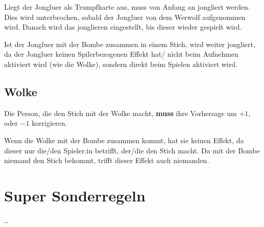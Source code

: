 \documentclass[3pt]{article}
\begin{document}
Liegt der Jongluer als Trumpfkarte aus, muss von Anfang an jongliert werden.
Dies wird unterbrochen, sobald der Jongluer von dem Werwolf aufgenommen wird.
Danach wird das jonglieren eingestellt, bis dieser wieder gespielt wird.

Ist der Jongluer mit der Bombe zusammen in einem Stich, wird weiter jongliert, da der Jongluer keinen Spilerbezogenen Effekt hat/ nicht beim Aufnehmen aktiviert wird (wie die Wolke), sondern direkt beim Spielen aktiviert wird.

\subsection{Wolke}
Die Person, die den Stich mit der Wolke macht, \textbf{muss} ihre Vorhersage um $+1$, oder $-1$ korrigieren.

Wenn die Wolke mit der Bombe zusammen kommt, hat sie keinen Effekt, da dieser nur die/den Spieler:in betrifft, der/die den Stich macht.
Da mit der Bombe niemand den Stich bekommt, trifft dieser Effekt auch niemanden.


\section{Super Sonderregeln}
\ldots
\end{document}
